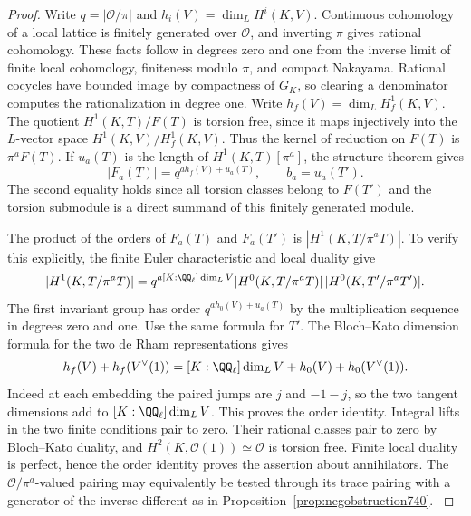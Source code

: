 \documentclass[a4paper,11pt]{article}
\theoremstyle{definition}
\theoremstyle{remark}
\numberwithin{equation}{section}
\begin{document}
\begin{proof}
Write \(q=|\mathcal O/\pi|\) and \(h_i(V)=\dim_L H^i(K,V)\).
Continuous cohomology of a local lattice is finitely generated over
\(\mathcal O\), and inverting \(\pi\) gives rational cohomology.
These facts follow in degrees zero and one from the inverse limit
of finite local cohomology, finiteness modulo \(\pi\), and compact
Nakayama. Rational cocycles have bounded image by compactness of
\(G_K\), so clearing a denominator computes the rationalization
in degree one. Write \(h_f(V)=\dim_L H_f^1(K,V)\).
The quotient \(H^1(K,T)/F(T)\) is torsion free, since it maps
injectively into the \(L\)-vector space \(H^1(K,V)/H_f^1(K,V)\).
Thus the kernel of reduction on \(F(T)\) is \(\pi^a F(T)\).
If \(u_a(T)\) is the length of \(H^1(K,T)[\pi^a]\), the structure
theorem gives
\[
  |F_a(T)|=q^{a h_f(V)+u_a(T)},\qquad b_a=u_a(T').
\]
The second equality holds since all torsion classes belong to
\(F(T')\) and the torsion submodule is a direct summand of
this finitely generated module.

The product of the orders of \(F_a(T)\) and \(F_a(T')\) is
\(|H^1(K,T/\pi^a T)|\). To verify this explicitly, the finite
Euler characteristic and local duality give
\[
 |H^1(K,T/\pi^a T)|=
 q^{a[K:\QQ_\ell]\dim_L V}
       |H^0(K,T/\pi^a T)|\,|H^0(K,T'/\pi^a T')|.
\]
The first invariant group has order \(q^{a h_0(V)+u_a(T)}\)
by the multiplication sequence in degrees zero and one. Use the
same formula for \(T'\). The Bloch--Kato dimension formula for
the two de Rham representations gives
\[
 h_f(V)+h_f(V^\vee(1))=[K:\QQ_\ell]\dim_L V
                          +h_0(V)+h_0(V^\vee(1)).
\]
Indeed at each embedding the paired jumps are \(j\) and \(-1-j\),
so the two tangent dimensions add to \([K:\QQ_\ell]\dim_L V\).
This proves the order identity. Integral lifts in the two finite
conditions pair to zero. Their rational classes pair to zero by
Bloch--Kato duality, and \(H^2(K,\mathcal O(1))\simeq\mathcal O\)
is torsion free. Finite local duality is perfect, hence the
order identity proves the assertion about annihilators.
The \(\mathcal O/\pi^a\)-valued pairing may equivalently be
tested through its trace pairing with a generator of the inverse
different as in Proposition~\ref{prop:negobstruction740}.
\cite[Theorem~3.8 and Corollary~3.8.4]{III-II-II-bktate717}
\cite[Chapter~I, \S2]{III-II-II-duality13}


\end{proof}
\end{document}
